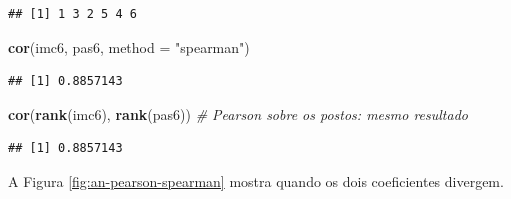\documentclass[
]{book}
\newenvironment{Shaded}{\begin{snugshade}}{\end{snugshade}}
\newcommand{\AttributeTok}[1]{\textcolor[rgb]{0.13,0.29,0.53}{#1}}
\newcommand{\CommentTok}[1]{\textcolor[rgb]{0.56,0.35,0.01}{\textit{#1}}}
\newcommand{\FunctionTok}[1]{\textcolor[rgb]{0.13,0.29,0.53}{\textbf{#1}}}
\newcommand{\NormalTok}[1]{#1}
\newcommand{\StringTok}[1]{\textcolor[rgb]{0.31,0.60,0.02}{#1}}
\begin{document}
\begin{verbatim}
## [1] 1 3 2 5 4 6
\end{verbatim}

\begin{Shaded}
\begin{Highlighting}[]
\FunctionTok{cor}\NormalTok{(imc6, pas6, }\AttributeTok{method =} \StringTok{"spearman"}\NormalTok{)}
\end{Highlighting}
\end{Shaded}

\begin{verbatim}
## [1] 0.8857143
\end{verbatim}

\begin{Shaded}
\begin{Highlighting}[]
\FunctionTok{cor}\NormalTok{(}\FunctionTok{rank}\NormalTok{(imc6), }\FunctionTok{rank}\NormalTok{(pas6))   }\CommentTok{\# Pearson sobre os postos: mesmo resultado}
\end{Highlighting}
\end{Shaded}

\begin{verbatim}
## [1] 0.8857143
\end{verbatim}

A Figura \ref{fig:an-pearson-spearman} mostra quando os dois coeficientes divergem.
\end{document}
